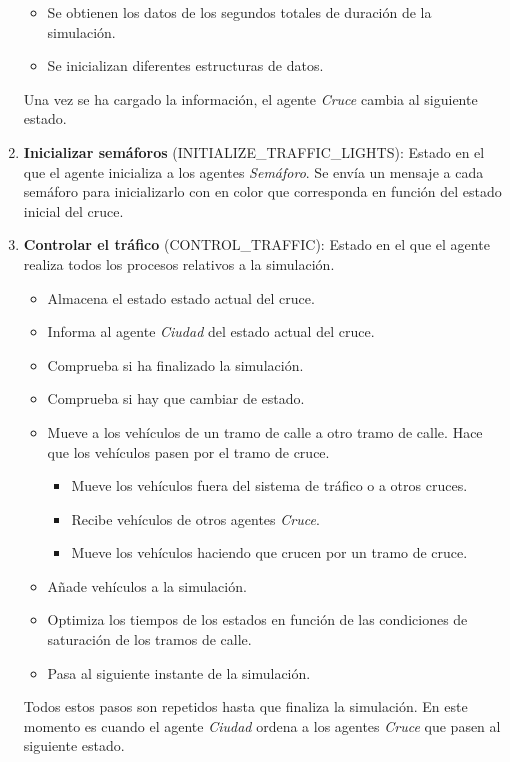 \begin{enumerate}
\begin{itemize}
        \item Se obtienen los datos de los segundos totales de duración de la simulación.  \item Se inicializan diferentes estructuras de datos.
    \end{itemize}
    Una vez se ha cargado la información, el agente \textit{Cruce} cambia al siguiente estado.
    \item \textbf{Inicializar semáforos} \footnotesize(INITIALIZE\_TRAFFIC\_LIGHTS)\normalsize: Estado en el que el agente inicializa a los agentes \textit{Semáforo}. Se envía un mensaje a cada semáforo para inicializarlo con en color que corresponda en función del estado inicial del cruce.
    \item \textbf{Controlar el tráfico} \footnotesize(CONTROL\_TRAFFIC)\normalsize: Estado en el que el agente realiza todos los procesos relativos a la simulación.
    \begin{itemize}
        \item Almacena el estado estado actual del cruce.
        \item Informa al agente \textit{Ciudad} del estado actual del cruce.
        \item Comprueba si ha finalizado la simulación.
        \item Comprueba si hay que cambiar de estado.
        \item Mueve a los vehículos de un tramo de calle a otro tramo de calle. Hace que los vehículos pasen por el tramo de cruce.
        \begin{itemize}
            \item Mueve los vehículos fuera del sistema de tráfico o a otros cruces.
            \item Recibe vehículos de otros agentes \textit{Cruce}.
            \item Mueve los vehículos haciendo que crucen por un tramo de cruce.
        \end{itemize}
        \item Añade vehículos a la simulación.
        \item Optimiza los tiempos de los estados en función de las condiciones de saturación de los tramos de calle.
        \item Pasa al siguiente instante de la simulación.
    \end{itemize}
    Todos estos pasos son repetidos hasta que finaliza la simulación. En este momento es cuando el agente \textit{Ciudad} ordena a los agentes \textit{Cruce} que pasen al siguiente estado.

\end{enumerate}
